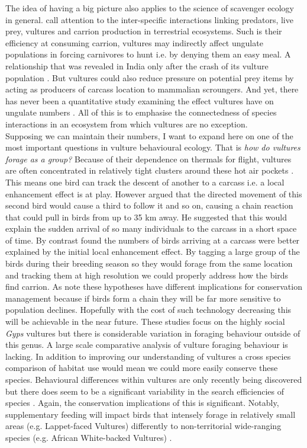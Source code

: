   The idea of having a big picture also applies to the science of scavenger ecology in general. \cite{moleon2014inter} call attention to the inter-specific interactions linking predators, live prey, vultures and carrion production in terrestrial ecosystems. Such is their efficiency at consuming carrion, vultures may indirectly affect ungulate populations in forcing carnivores to hunt i.e. by denying them an easy meal. A relationship that was revealed in India only after the crash of its vulture population \citep{moleon2014inter}. But vultures could also reduce pressure on potential prey items by acting as producers of carcass location to mammalian scroungers. And yet, there has never been a quantitative study examining the effect vultures have on ungulate numbers \citep{moleon2014inter,elbroch2013nuisance}. All of this is to emphasise the connectedness of species interactions in an ecosystem from which vultures are no exception. \\
  \indent Supposing we can maintain their numbers, I want to expand here on one of the most important questions in vulture behavioural ecology. That is \textit{how do vultures forage as a group?} Because of their dependence on thermals for flight, vultures are often concentrated in relatively tight clusters around these hot air pockets \citep{xirouchakis2009foraging}. This means one bird can track the descent of another to a carcass i.e. a local enhancement effect is at play. However \cite{houston1974food} argued that the directed movement of this second bird would cause a third to follow it and so on, causing a chain reaction that could pull in birds from up to 35 km away. He suggested that this would explain the sudden arrival of so many individuals to the carcass in a short space of time. By contrast \cite{cortes2014bird} found the numbers of birds arriving at a carcass were better explained by the initial local enhancement effect. By tagging a large group of the birds during their breeding season so they would forage from the same location and tracking them at high resolution we could properly address how the birds find carrion. As \cite{cortes2014bird} note these hypotheses have different implications for conservation management because if birds form a chain they will be far more sensitive to population declines. Hopefully with the cost of such technology decreasing this will be achievable in the near future. These studies focus on the highly social \textit{Gyps} vultures but there is considerable variation in foraging behaviour outside of this genus. A large scale comparative analysis of vulture foraging behaviour is lacking. In addition to improving our understanding of vultures a cross species comparison of habitat use would mean we could more easily conserve these species. Behavioural differences within vultures are only recently being discovered but there does seem to be a significant variability in the search efficiencies of species \citep{spiegel2013factors}. Again, the conservation implications of this is significant. Notably, supplementary feeding will impact birds that intensely forage in relatively small areas (e.g. Lappet-faced Vultures) differently to non-territorial wide-ranging species (e.g. African White-backed Vultures) \citep{spiegel2013factors}. \\
